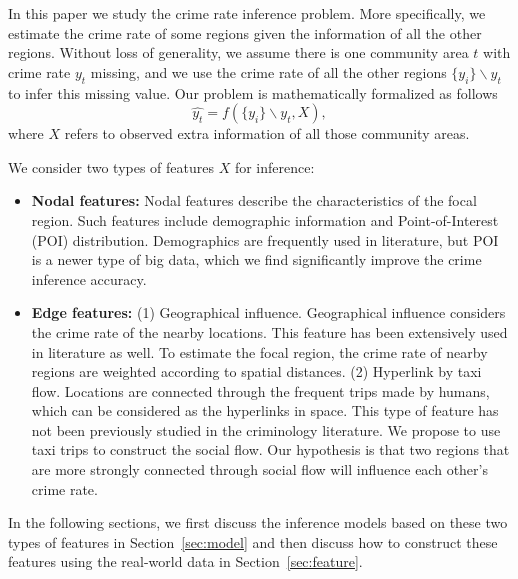 In this paper we study the crime rate inference problem. More specifically, we estimate the crime rate of some regions given the information of all the other regions. Without loss of generality, we assume there is one community area $t$ with crime rate $y_t$ missing, and we use the crime rate of all the other regions $\{y_i \} \backslash y_t$ to infer this missing value. Our problem is mathematically formalized as follows
\begin{equation}
\hat{y_t} = f( \{y_i\} \backslash y_t, X),
\end{equation}
where  $X$ refers to observed extra information of  all those community areas.




\smallskip
We consider two types of features $X$ for inference:
\begin{itemize}[leftmargin=*]
\item {\bf Nodal features:} Nodal features describe the characteristics of the focal region. Such features include demographic information and Point-of-Interest (POI) distribution. Demographics are frequently used in literature, but POI is a newer type of big data, which we find significantly improve the crime inference accuracy.
\item {\bf Edge features:} (1) Geographical influence. Geographical influence considers the crime rate of the nearby locations.  This feature has been extensively used in
literature as well. To estimate the focal region, the
crime rate of nearby regions are weighted according
to spatial distances. (2) Hyperlink by taxi flow. Locations are connected through the frequent trips made by humans, which can be considered as the hyperlinks in space. This type of feature has not been previously studied in the criminology literature. We propose to use taxi trips to construct the social flow. Our hypothesis is that two regions that are more strongly connected through social flow will influence each other's crime rate.
\end{itemize}

In the following sections, we first discuss the inference models based on these two types of features in Section~\ref{sec:model} and then discuss how to construct these features using the real-world data in Section~\ref{sec:feature}.



